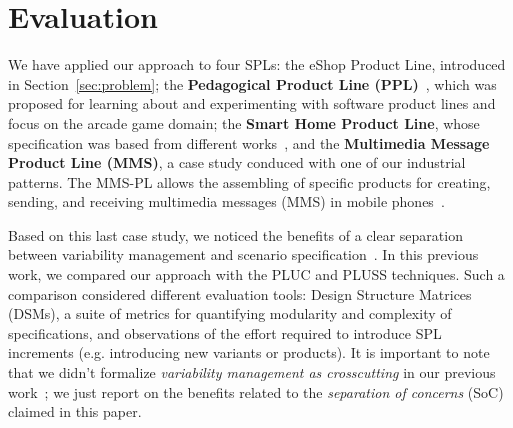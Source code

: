 \documentclass{acm_proc_article-sp}
\begin{document}
%
%
%
%
\section{Evaluation}
\label{sec:evaluation}

We have applied our approach to four SPLs: the eShop Product Line, introduced in
Section~\ref{sec:problem}; the {\bf Pedagogical Product Line
(PPL)}~\cite{PPL:2008}, which was proposed for learning about and experimenting
with software product lines and focus on the arcade game domain; the {\bf Smart
Home Product Line}, whose specification was based from different
works~\cite{Pohl:2005aa,Alferez:2008aa}, and the {\bf Multimedia Message Product
Line (MMS)}, a case study conduced with one of our industrial patterns. The
MMS-PL allows the assembling of specific products for creating, sending, and
receiving multimedia messages (MMS) in mobile phones~\cite{Bonifacio:2008aa}.


Based on this last case study, we noticed the benefits of a clear separation
between variability management and scenario
specification~\cite{Bonifacio:2008aa}. In this previous work, we compared our
approach with the PLUC and PLUSS techniques. Such a comparison considered
different evaluation tools: Design Structure Matrices (DSMs), a suite of metrics
for quantifying modularity and complexity of specifications, and observations of
the effort required to introduce SPL increments (e.g. introducing new variants or
products). It is important to note that we didn't formalize \emph{variability
management as crosscutting} in our previous work~\cite{Bonifacio:2008aa}; we just
report on the benefits related to the \emph{separation of concerns} (SoC) claimed
in this paper.
\end{document}
